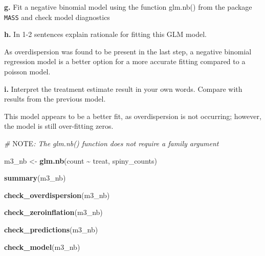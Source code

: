 \documentclass[
]{article}
\newenvironment{Shaded}{\begin{snugshade}}{\end{snugshade}}
\newcommand{\AlertTok}[1]{\textcolor[rgb]{0.94,0.16,0.16}{#1}}
\newcommand{\CommentTok}[1]{\textcolor[rgb]{0.56,0.35,0.01}{\textit{#1}}}
\newcommand{\FunctionTok}[1]{\textcolor[rgb]{0.13,0.29,0.53}{\textbf{#1}}}
\newcommand{\NormalTok}[1]{#1}
\newcommand{\OtherTok}[1]{\textcolor[rgb]{0.56,0.35,0.01}{#1}}
\newcommand{\SpecialCharTok}[1]{\textcolor[rgb]{0.81,0.36,0.00}{\textbf{#1}}}
\begin{document}
\textbf{g.} Fit a negative binomial model using the function glm.nb()
from the package \texttt{MASS} and check model diagnostics

\textbf{h.} In 1-2 sentences explain rationale for fitting this GLM
model.

As overdispersion was found to be present in the last step, a negative
binomial regression model is a better option for a more accurate fitting
compared to a poisson model.

\textbf{i.} Interpret the treatment estimate result in your own words.
Compare with results from the previous model.

This model appears to be a better fit, as overdispersion is not
occurring; however, the model is still over-fitting zeros.

\begin{Shaded}
\begin{Highlighting}[]
\CommentTok{\# }\AlertTok{NOTE}\CommentTok{: The \textasciigrave{}glm.nb()\textasciigrave{} function does not require a \textasciigrave{}family\textasciigrave{} argument}

\NormalTok{m3\_nb }\OtherTok{\textless{}{-}} \FunctionTok{glm.nb}\NormalTok{(count }\SpecialCharTok{\textasciitilde{}}\NormalTok{ treat, spiny\_counts)}

\FunctionTok{summary}\NormalTok{(m3\_nb)}
\end{Highlighting}
\end{Shaded}

\begin{Shaded}
\begin{Highlighting}[]
\FunctionTok{check\_overdispersion}\NormalTok{(m3\_nb)}
\end{Highlighting}
\end{Shaded}

\begin{Shaded}
\begin{Highlighting}[]
\FunctionTok{check\_zeroinflation}\NormalTok{(m3\_nb)}
\end{Highlighting}
\end{Shaded}

\begin{Shaded}
\begin{Highlighting}[]
\FunctionTok{check\_predictions}\NormalTok{(m3\_nb)}
\end{Highlighting}
\end{Shaded}

\begin{Shaded}
\begin{Highlighting}[]
\FunctionTok{check\_model}\NormalTok{(m3\_nb)}
\end{Highlighting}
\end{Shaded}
\end{document}
